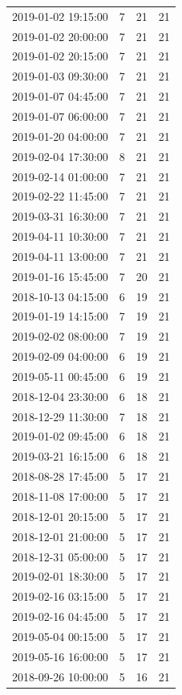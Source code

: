 \begin{tabular}{lrrr}
2019-01-02 19:15:00 & 7 & 21 & 21 \\
2019-01-02 20:00:00 & 7 & 21 & 21 \\
2019-01-02 20:15:00 & 7 & 21 & 21 \\
2019-01-03 09:30:00 & 7 & 21 & 21 \\
2019-01-07 04:45:00 & 7 & 21 & 21 \\
2019-01-07 06:00:00 & 7 & 21 & 21 \\
2019-01-20 04:00:00 & 7 & 21 & 21 \\
2019-02-04 17:30:00 & 8 & 21 & 21 \\
2019-02-14 01:00:00 & 7 & 21 & 21 \\
2019-02-22 11:45:00 & 7 & 21 & 21 \\
2019-03-31 16:30:00 & 7 & 21 & 21 \\
2019-04-11 10:30:00 & 7 & 21 & 21 \\
2019-04-11 13:00:00 & 7 & 21 & 21 \\
2019-01-16 15:45:00 & 7 & 20 & 21 \\
2018-10-13 04:15:00 & 6 & 19 & 21 \\
2019-01-19 14:15:00 & 7 & 19 & 21 \\
2019-02-02 08:00:00 & 7 & 19 & 21 \\
2019-02-09 04:00:00 & 6 & 19 & 21 \\
2019-05-11 00:45:00 & 6 & 19 & 21 \\
2018-12-04 23:30:00 & 6 & 18 & 21 \\
2018-12-29 11:30:00 & 7 & 18 & 21 \\
2019-01-02 09:45:00 & 6 & 18 & 21 \\
2019-03-21 16:15:00 & 6 & 18 & 21 \\
2018-08-28 17:45:00 & 5 & 17 & 21 \\
2018-11-08 17:00:00 & 5 & 17 & 21 \\
2018-12-01 20:15:00 & 5 & 17 & 21 \\
2018-12-01 21:00:00 & 5 & 17 & 21 \\
2018-12-31 05:00:00 & 5 & 17 & 21 \\
2019-02-01 18:30:00 & 5 & 17 & 21 \\
2019-02-16 03:15:00 & 5 & 17 & 21 \\
2019-02-16 04:45:00 & 5 & 17 & 21 \\
2019-05-04 00:15:00 & 5 & 17 & 21 \\
2019-05-16 16:00:00 & 5 & 17 & 21 \\
2018-09-26 10:00:00 & 5 & 16 & 21 \\

\end{tabular}
